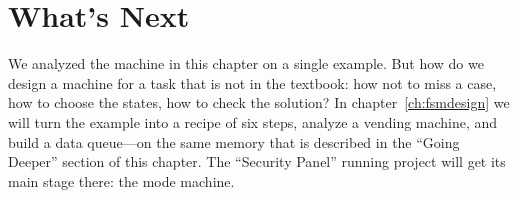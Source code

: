 \section{What's Next}

We analyzed the machine in this chapter on a single example. But how do we design
a machine for a task that is not in the textbook: how not to miss a case, how to
choose the states, how to check the solution? In chapter~\ref{ch:fsmdesign} we
will turn the example into a recipe of six steps, analyze a vending machine, and
build a data queue---on the same memory that is described in the ``Going
Deeper'' section of this chapter. The ``Security Panel'' running project will
get its main stage there: the mode machine.
